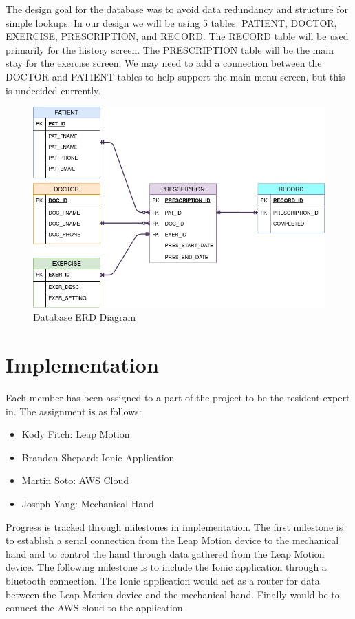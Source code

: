 \documentclass[a4paper,10pt]{article}
\begin{document}
            The design goal for the database was to avoid data redundancy and structure for simple lookups. In our design we will be using 5 tables: PATIENT, DOCTOR, EXERCISE, PRESCRIPTION, and RECORD. The RECORD table will be used primarily for the history screen. The PRESCRIPTION table will be the main stay for the exercise screen. We may need to add a connection between the DOCTOR and PATIENT tables to help support the main menu screen, but this is undecided currently. 
            
            \begin{figure}[h]
            \centering
            \includegraphics[width=140mm, scale=1]{databaseDiagram}
            \caption{Database ERD Diagram}
            \end{figure}
            

\section{Implementation}

            Each member has been assigned to a part of the project to be the resident expert in. The assignment is as follows:
        \begin{itemize}
         \item Kody Fitch: Leap Motion
         \item Brandon Shepard: Ionic Application
         \item Martin Soto: AWS Cloud
         \item Joseph Yang: Mechanical Hand
        \end{itemize}

            Progress is tracked through milestones in implementation. The first milestone is to establish a serial connection from the Leap Motion device to the mechanical hand and to control the hand through data gathered from the Leap Motion device. The following milestone is to include the Ionic application through a bluetooth connection. The Ionic application would act as a router for data between the Leap Motion device and the mechanical hand. Finally would be to connect the AWS cloud to the application.
\end{document}
